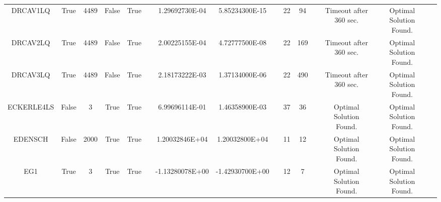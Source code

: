 \begin{longtable}{ccccccccccccccc}
	\cellcolor{default2} DRCAV1LQ& \cellcolor{default2} True& \cellcolor{default2} 4489& \cellcolor{default2} False& \cellcolor{default2} True& \cellcolor{header} & \cellcolor{poor} 1.29692730E-04& \cellcolor{best} 5.85234300E-15& \cellcolor{header} & \cellcolor{best} 22& \cellcolor{poor} 94& \cellcolor{header} & \cellcolor{default2} Timeout after 360 sec.& \cellcolor{default2} Optimal Solution Found.& \cellcolor{header} \\
	\cellcolor{default1} DRCAV2LQ& \cellcolor{default1} True& \cellcolor{default1} 4489& \cellcolor{default1} False& \cellcolor{default1} True& \cellcolor{header} & \cellcolor{poor} 2.00225155E-04& \cellcolor{best} 4.72777500E-08& \cellcolor{header} & \cellcolor{best} 22& \cellcolor{poor} 169& \cellcolor{header} & \cellcolor{default1} Timeout after 360 sec.& \cellcolor{default1} Optimal Solution Found.& \cellcolor{header} \\
	\cellcolor{default2} DRCAV3LQ& \cellcolor{default2} True& \cellcolor{default2} 4489& \cellcolor{default2} False& \cellcolor{default2} True& \cellcolor{header} & \cellcolor{poor} 2.18173222E-03& \cellcolor{best} 1.37134000E-06& \cellcolor{header} & \cellcolor{best} 22& \cellcolor{poor} 490& \cellcolor{header} & \cellcolor{default2} Timeout after 360 sec.& \cellcolor{default2} Optimal Solution Found.& \cellcolor{header} \\
	\cellcolor{default1} ECKERLE4LS& \cellcolor{default1} False& \cellcolor{default1} 3& \cellcolor{default1} True& \cellcolor{default1} True& \cellcolor{header} & \cellcolor{poor} 6.99696114E-01& \cellcolor{best} 1.46358900E-03& \cellcolor{header} & \cellcolor{ok} 37& \cellcolor{best} 36& \cellcolor{header} & \cellcolor{default1} Optimal Solution Found.& \cellcolor{default1} Optimal Solution Found.& \cellcolor{header} \\
	\cellcolor{default2} EDENSCH& \cellcolor{default2} False& \cellcolor{default2} 2000& \cellcolor{default2} True& \cellcolor{default2} True& \cellcolor{header} & \cellcolor{ok} 1.20032846E+04& \cellcolor{best} 1.20032800E+04& \cellcolor{header} & \cellcolor{best} 11& \cellcolor{ok} 12& \cellcolor{header} & \cellcolor{default2} Optimal Solution Found.& \cellcolor{default2} Optimal Solution Found.& \cellcolor{header} \\
	\cellcolor{default1} EG1& \cellcolor{default1} True& \cellcolor{default1} 3& \cellcolor{default1} True& \cellcolor{default1} True& \cellcolor{header} & \cellcolor{poor} -1.13280078E+00& \cellcolor{best} -1.42930700E+00& \cellcolor{header} & \cellcolor{ok} 12& \cellcolor{best} 7& \cellcolor{header} & \cellcolor{default1} Optimal Solution Found.& \cellcolor{default1} Optimal Solution Found.& \cellcolor{header} \\

\end{longtable}
